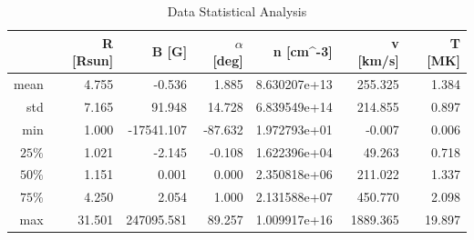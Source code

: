 \begin{table}[h]
    \caption{Data Statistical Analysis}
    \label{tab:data_stats}
    \begin{tabular}{@{}rrrrrrr@{}}
    \toprule
    \textbf{} & \textbf{R {[}Rsun{]}} & \textbf{B {[}G{]}} & \textbf{$\alpha$ {[}deg{]}} & \textbf{n {[}cm\textasciicircum{}-3{]}} & \textbf{v {[}km/s{]}} & \textbf{T {[}MK{]}} \\ \midrule
    mean      & 4.755                 & -0.536             & 1.885                    & 8.630207e+13                            & 255.325               & 1.384               \\
    std       & 7.165                 & 91.948             & 14.728                   & 6.839549e+14                            & 214.855               & 0.897               \\
    min       & 1.000                 & -17541.107         & -87.632                  & 1.972793e+01                            & -0.007                & 0.006               \\
    $25\%$    & 1.021                 & -2.145             & -0.108                   & 1.622396e+04                            & 49.263                & 0.718               \\
    $50\%$    & 1.151                 & 0.001              & 0.000                    & 2.350818e+06                            & 211.022               & 1.337               \\
    $75\%$    & 4.250                 & 2.054              & 1.000                    & 2.131588e+07                            & 450.770               & 2.098               \\
    max       & 31.501                & 247095.581         & 89.257                   & 1.009917e+16                            & 1889.365              & 19.897              \\ \bottomrule
    \end{tabular}
\end{table}